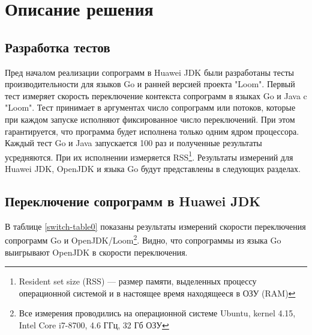 \section{Описание решения}
	
	\subsection{Разработка тестов}
	Пред началом реализации сопрограмм в Huawei JDK были разработаны тесты
	производительности для языков Go и ранней версией проекта "Loom". 
	Первый тест измеряет скорость переключение контекста сопрограмм в языках Go и
	Java c "Loom". Тест принимает в аргументах число сопрограмм или потоков, которые при каждом запуске
	исполняют фиксированное число переключений. При этом гарантируется, что программа будет исполнена 
	только одним ядром процессора. Каждый тест Go и Java запускается 100 раз и полученные результаты усредняются.
	При их исполнении измеряется RSS\footnote{Resident set size (RSS) — размер памяти, 
		выделенных процессу операционной системой и в настоящее время находящееся в ОЗУ (RAM)}.
	Результаты измерений для Huawei JDK, OpenJDK и языка Go будут представлены в следующих разделах.
	
	
	\subsection{Переключение сопрограмм в Huawei JDK}
	В таблице \ref{switch-table0} показаны результаты измерений скорости переключения сопрограмм Go и 
	OpenJDK/Loom\footnote{Все измерения проводились на операционной системе Ubuntu, kernel 4.15, Intel Core i7-8700, 4.6 ГГц, 32 Гб ОЗУ}. 
	Видно, что сопрограммы из языка Go выигрывают OpenJDK в скорости переключения.
	
